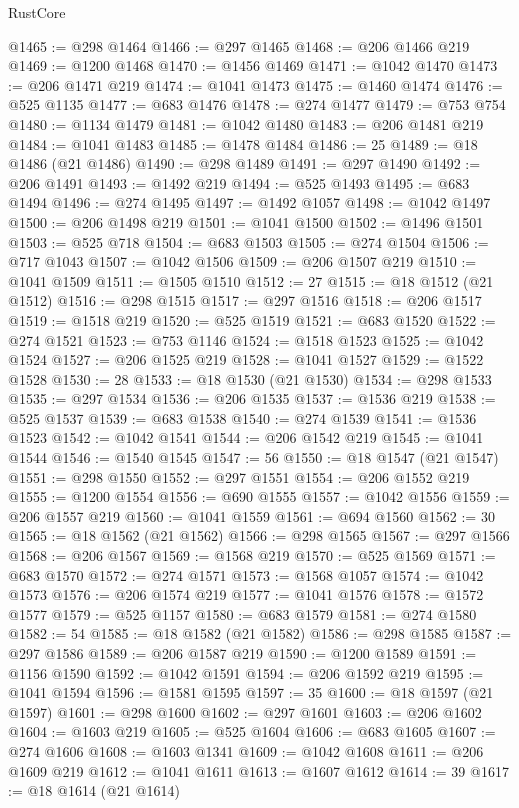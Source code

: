 \begin{lexlean}{RustCore}
\begin{coremodule}
@1465 := @298 @1464
@1466 := @297 @1465
@1468 := @206 @1466 @219
@1469 := @1200 @1468
@1470 := @1456 @1469
@1471 := @1042 @1470
@1473 := @206 @1471 @219
@1474 := @1041 @1473
@1475 := @1460 @1474
@1476 := @525 @1135
@1477 := @683 @1476
@1478 := @274 @1477
@1479 := @753 @754
@1480 := @1134 @1479
@1481 := @1042 @1480
@1483 := @206 @1481 @219
@1484 := @1041 @1483
@1485 := @1478 @1484
@1486 := 25
@1489 := @18 @1486 (@21 @1486)
@1490 := @298 @1489
@1491 := @297 @1490
@1492 := @206 @1491
@1493 := @1492 @219
@1494 := @525 @1493
@1495 := @683 @1494
@1496 := @274 @1495
@1497 := @1492 @1057
@1498 := @1042 @1497
@1500 := @206 @1498 @219
@1501 := @1041 @1500
@1502 := @1496 @1501
@1503 := @525 @718
@1504 := @683 @1503
@1505 := @274 @1504
@1506 := @717 @1043
@1507 := @1042 @1506
@1509 := @206 @1507 @219
@1510 := @1041 @1509
@1511 := @1505 @1510
@1512 := 27
@1515 := @18 @1512 (@21 @1512)
@1516 := @298 @1515
@1517 := @297 @1516
@1518 := @206 @1517
@1519 := @1518 @219
@1520 := @525 @1519
@1521 := @683 @1520
@1522 := @274 @1521
@1523 := @753 @1146
@1524 := @1518 @1523
@1525 := @1042 @1524
@1527 := @206 @1525 @219
@1528 := @1041 @1527
@1529 := @1522 @1528
@1530 := 28
@1533 := @18 @1530 (@21 @1530)
@1534 := @298 @1533
@1535 := @297 @1534
@1536 := @206 @1535
@1537 := @1536 @219
@1538 := @525 @1537
@1539 := @683 @1538
@1540 := @274 @1539
@1541 := @1536 @1523
@1542 := @1042 @1541
@1544 := @206 @1542 @219
@1545 := @1041 @1544
@1546 := @1540 @1545
@1547 := 56
@1550 := @18 @1547 (@21 @1547)
@1551 := @298 @1550
@1552 := @297 @1551
@1554 := @206 @1552 @219
@1555 := @1200 @1554
@1556 := @690 @1555
@1557 := @1042 @1556
@1559 := @206 @1557 @219
@1560 := @1041 @1559
@1561 := @694 @1560
@1562 := 30
@1565 := @18 @1562 (@21 @1562)
@1566 := @298 @1565
@1567 := @297 @1566
@1568 := @206 @1567
@1569 := @1568 @219
@1570 := @525 @1569
@1571 := @683 @1570
@1572 := @274 @1571
@1573 := @1568 @1057
@1574 := @1042 @1573
@1576 := @206 @1574 @219
@1577 := @1041 @1576
@1578 := @1572 @1577
@1579 := @525 @1157
@1580 := @683 @1579
@1581 := @274 @1580
@1582 := 54
@1585 := @18 @1582 (@21 @1582)
@1586 := @298 @1585
@1587 := @297 @1586
@1589 := @206 @1587 @219
@1590 := @1200 @1589
@1591 := @1156 @1590
@1592 := @1042 @1591
@1594 := @206 @1592 @219
@1595 := @1041 @1594
@1596 := @1581 @1595
@1597 := 35
@1600 := @18 @1597 (@21 @1597)
@1601 := @298 @1600
@1602 := @297 @1601
@1603 := @206 @1602
@1604 := @1603 @219
@1605 := @525 @1604
@1606 := @683 @1605
@1607 := @274 @1606
@1608 := @1603 @1341
@1609 := @1042 @1608
@1611 := @206 @1609 @219
@1612 := @1041 @1611
@1613 := @1607 @1612
@1614 := 39
@1617 := @18 @1614 (@21 @1614)

\end{coremodule}
\end{lexlean}
